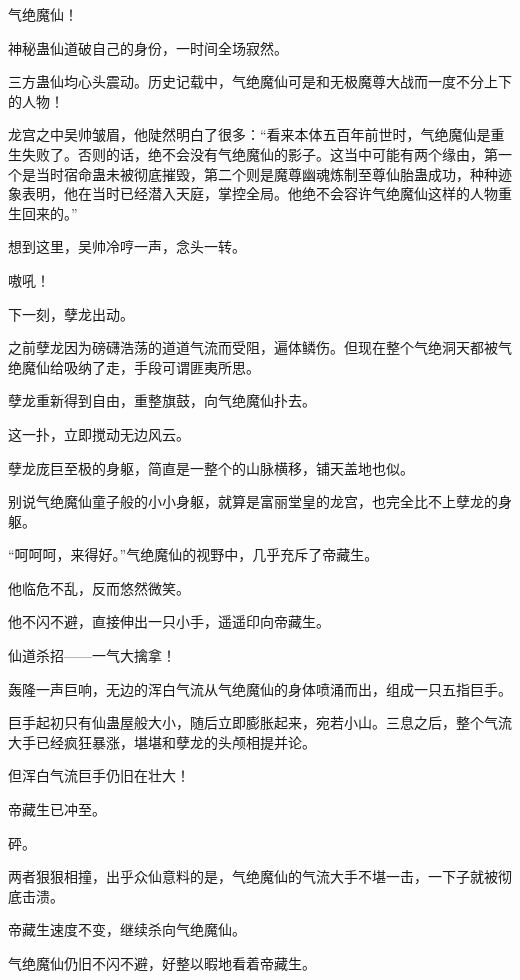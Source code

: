 
\begin{this_body}



气绝魔仙！

神秘蛊仙道破自己的身份，一时间全场寂然。

三方蛊仙均心头震动。历史记载中，气绝魔仙可是和无极魔尊大战而一度不分上下的人物！

龙宫之中吴帅皱眉，他陡然明白了很多：“看来本体五百年前世时，气绝魔仙是重生失败了。否则的话，绝不会没有气绝魔仙的影子。这当中可能有两个缘由，第一个是当时宿命蛊未被彻底摧毁，第二个则是魔尊幽魂炼制至尊仙胎蛊成功，种种迹象表明，他在当时已经潜入天庭，掌控全局。他绝不会容许气绝魔仙这样的人物重生回来的。”

想到这里，吴帅冷哼一声，念头一转。

嗷吼！

下一刻，孽龙出动。

之前孽龙因为磅礴浩荡的道道气流而受阻，遍体鳞伤。但现在整个气绝洞天都被气绝魔仙给吸纳了走，手段可谓匪夷所思。

孽龙重新得到自由，重整旗鼓，向气绝魔仙扑去。

这一扑，立即搅动无边风云。

孽龙庞巨至极的身躯，简直是一整个的山脉横移，铺天盖地也似。

别说气绝魔仙童子般的小小身躯，就算是富丽堂皇的龙宫，也完全比不上孽龙的身躯。

“呵呵呵，来得好。”气绝魔仙的视野中，几乎充斥了帝藏生。

他临危不乱，反而悠然微笑。

他不闪不避，直接伸出一只小手，遥遥印向帝藏生。

仙道杀招——一气大擒拿！

轰隆一声巨响，无边的浑白气流从气绝魔仙的身体喷涌而出，组成一只五指巨手。

巨手起初只有仙蛊屋般大小，随后立即膨胀起来，宛若小山。三息之后，整个气流大手已经疯狂暴涨，堪堪和孽龙的头颅相提并论。

但浑白气流巨手仍旧在壮大！

帝藏生已冲至。

砰。

两者狠狠相撞，出乎众仙意料的是，气绝魔仙的气流大手不堪一击，一下子就被彻底击溃。

帝藏生速度不变，继续杀向气绝魔仙。

气绝魔仙仍旧不闪不避，好整以暇地看着帝藏生。


\end{this_body}
